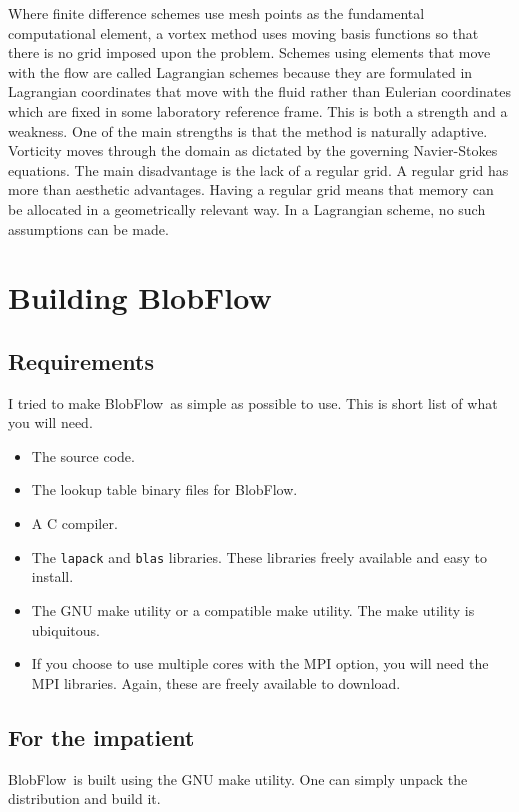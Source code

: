 \documentclass[12pt]{report}
\newcommand{\BF}{BlobFlow}
\begin{document}
Where finite
difference schemes use mesh points as the fundamental computational element,
a vortex method uses moving basis functions so that there is no grid imposed
upon the problem.  Schemes using elements that move with the flow are called
Lagrangian schemes because they are formulated in Lagrangian coordinates
that move with the fluid rather than Eulerian coordinates which are fixed in
some laboratory reference frame.  This is both a strength and a weakness.
One of the main strengths is that the method is naturally adaptive.
Vorticity moves through the domain as dictated by the governing
Navier-Stokes equations.  The main disadvantage is the lack of a regular
grid.  A regular grid has more than aesthetic advantages.  Having a regular
grid means that memory can be allocated in a geometrically relevant way.
In a Lagrangian scheme, no such assumptions can be made.

\chapter{Building \BF}

\section{Requirements}

I tried to make \BF~as simple as possible to use.  This is short list of what
you will need.

\begin{itemize}
\item The source code.
\item The lookup table binary files for \BF.
 \item A C compiler.
\item The \texttt{lapack} and \texttt{blas} libraries.  These libraries freely
available and easy to install.
\item The GNU make utility or a compatible make utility.  The make utility is
ubiquitous.
\item If you choose to use multiple cores with the MPI option, you will need
the MPI libraries.  Again, these are freely available to download.
\end{itemize}


\section{For the impatient}

\BF~is built using the GNU make utility.  One can simply unpack the distribution
and build it.
\end{document}
